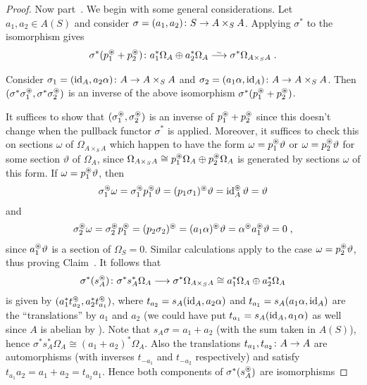 \documentclass[a4paper,parskip=half,numbers=enddot, DIV=12]{scrreprt}
\begin{document}
\begin{proof}
	Now part~. We begin with some general considerations. Let $a_1,a_2\in A(S)$ and consider $\sigma=(a_1,a_2)\colon S\morphism A\times_SA$. Applying $\sigma^*$ to the isomorphism  gives
	\begin{align*}
		\sigma^*(p_1^\oast+p_2^\oast)\colon a_1^*\Omega_A\oplus a_2^*\Omega_A\isomorphism \sigma^*\Omega_{A\times_SA}\;.
	\end{align*}
	\begin{claim}
		Consider $\sigma_1=(\id_A, a_2\alpha)\colon A\morphism A\times_SA$ and $\sigma_2=( a_1\alpha,\id_A)\colon A\morphism A\times_SA$. Then  $(\sigma^*\sigma_1^\oast,\sigma^*\sigma_2^\oast)$ is an inverse of the above isomorphism $\sigma^*(p_1^\oast+p_2^\oast)$. 
	\end{claim}
	It suffices to show that $(\sigma_1^\oast,\sigma_2^\oast)$ is an inverse of $p_1^\oast+p_2^\oast$ since this doesn't change when the pullback functor $\sigma^*$ is applied. Moreover, it suffices to check this on sections $\omega$ of $\Omega_{A\times_SA}$ which happen to have the form $\omega=p_1^\oast\vartheta$ or $\omega=p_2^\oast \vartheta$ for some section $\vartheta$ of $\Omega_A$, since $\Omega_{A\times_SA}\cong p_1^\oast\Omega_A\oplus p_2^\oast\Omega_A$ is generated by sections $\omega$ of this form. If $\omega=p_1^\oast\vartheta$, then
	\begin{align*}
		\sigma_1^\oast\omega=\sigma_1^\oast p_1^\oast\vartheta=(p_1 \sigma_1)^\oast\vartheta=\operatorname{id}_A^\oast\vartheta=\vartheta
	\end{align*}
	and
	\begin{align*}
		\sigma_2^\oast\omega=\sigma_2^\oast p_1^\oast=(p_2\sigma_2)^\oast=(a_1\alpha)^\oast \vartheta=\alpha^\oast a_1^\oast\vartheta=0\;,
	\end{align*}
	since $a_1^\oast\vartheta$ is a section of $\Omega_S=0$. Similar calculations apply to the case $\omega=p_2^\oast\vartheta$, thus proving Claim~. It follows that 
	\begin{align*}
		\sigma^*(s_A^\oast)\colon \sigma^*s_A^*\Omega_A\morphism \sigma^*\Omega_{A\times_SA}\cong a_1^*\Omega_A\oplus a_2 ^*\Omega_A
	\end{align*}
	is given by $(a_1^*t_{a_2}^\oast,a_2^*t_{a_1}^\oast)$, where $t_{a_2}=s_A(\operatorname{id}_A,a_2\alpha)$ and $t_{a_1}=s_A(a_1\alpha,\operatorname{id}_A)$ are the ``translations'' by $a_1$ and $a_2$ (we could have put $t_{a_1}=s_A(\operatorname{id}_A,a_1\alpha)$ as well since $A$ is abelian by ). Note that $s_A\sigma=a_1+a_2$ (with the sum taken in $A(S)$), hence $\sigma^*s_A^*\Omega_A\cong (a_1+a_2)^*\Omega_A$. Also the translations $t_{a_1},t_{a_2}\colon A\morphism A$ are automorphisms (with inverses $t_{-a_1}$ and $t_{-a_2}$ respectively) and satisfy $t_{a_1}a_2=a_1+a_2=t_{a_2}a_1$. Hence both components of $\sigma^*(s_A^\oast)$ are isomorphisms

\end{proof}
\end{document}
